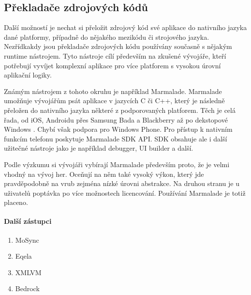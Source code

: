 \subsection{Překladače zdrojových kódů}
Další možností je nechat si přeložit zdrojový kód své aplikace do nativního jazyka dané platformy, případně do nějakého mezikódu či strojového jazyka. Nezřídkakdy jsou překladače zdrojových kódu používány současně s nějakým runtime nástrojem. Tyto nástroje cílí především na zkušené vývojáře, kteří potřebují vyvíjet komplexní aplikace pro více platforem s vysokou úrovní aplikační logiky.

Známým nástrojem z tohoto okruhu je například Marmalade. Marmalade umožňuje vývojářům psát aplikace v jazycích C či C++, který je následně přeložen do nativního jazyka některé z podporovaných platforem. Těch je celá řada, od iOS, Androidu přes Samsung Bada a Blackberry až po dekstopové Windows \cite{marmalade}. Chybí však podpora pro Windows Phone. Pro přístup k nativním funkcím telefonu poskytuje Marmalade SDK API. SDK obsahuje ale i další užitečné nástroje jako je například debugger, UI builder a další.

Podle výzkumu si vývojáři vybírají Marmalade především proto, že je velmi vhodný na vývoj her. Oceňují na něm také vysoký výkon, který jde pravděpodobně na vrub zejména nízké úrovni abstrakce. Na druhou stranu je u uživatelů poptávka po více možnostech licencování. Používání Marmalade je totiž placeno. \cite{visionmobile_survey}

\paragraph{Další zástupci}
\begin{enumerate}
	\item MoSync
	\item Eqela
	\item XMLVM
	\item Bedrock
\end{enumerate}